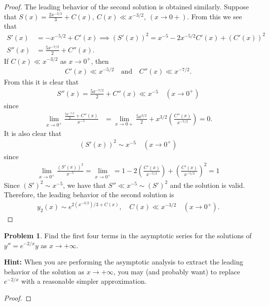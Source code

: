 \documentclass[12pt]{article}
\theoremstyle{definition}
\newtheorem{problem}{Problem}
\begin{document}
\begin{proof}
  The leading behavior of the second solution is obtained similarly.
  Suppose that $S(x) = \frac{2x^{-3/2}}{3} + C(x),\ C(x) \ll x^{-3/2}, \ (x\to 0+)$. From this we see that
  \begin{align*}
    S'(x) &= -x^{-5/2} + C'(x) \implies (S'(x))^2 = x^{-5} -2x^{-5/2}C'(x) + (C'(x))^2 \\
    S''(x) &= \frac{5x^{-7/2}}{2} + C''(x).
  \end{align*}
  If $C(x) \ll x^{-3/2}$ as $x\to 0^+$, then
  \begin{align*}
    C'(x) \ll x^{-5/2} \quad \text{and} \quad C''(x) \ll x^{-7/2}.
  \end{align*}
  From this it is clear that
  \begin{align*}
    S''(x) = \frac{5x^{-7/2}}{2}+ C''(x) \ll x^{-5} \quad (x\to 0^+)
  \end{align*}
  since
  \begin{align*}
    \lim_{x\to 0^+} \frac{\frac{5x^{-7/2}}{2}+ C''(x)}{x^{-5}} &=  \lim_{x\to 0+}\frac{5x^{3/2}}{2} + x^{3/2}\left(\frac{C''(x)}{x^{-7/2}}\right) = 0.
  \end{align*}
  It is also clear that
  \begin{align*}
    (S'(x))^2 \sim x^{-5}\quad (x\to 0^+)
  \end{align*}
  since
  \begin{align*}
    \lim_{x\to 0^+} \frac{(S'(x))^2}{x^{-5}} = \lim_{x\to 0^+} = 1 - 2\left(\frac{C'(x)}{x^{-5/2}}\right) + \left(\frac{C'(x)}{x^{-5/2}}\right)^2 = 1
  \end{align*}
  Since $(S')^2 \sim x^{-5}$, we have that $S'' \ll x^{-5} \sim (S')^2$ and the solution is valid. Therefore, the leading behavior of the second solution is
  \begin{align*}
    y_2(x) \sim e^{2(x^{-3/2})/3 + C(x)},\quad C(x) \ll x^{-3/2} \quad(x\to 0^+).
  \end{align*}

\end{proof}
\newpage


\begin{problem}
  Find the first four terms in the asymptotic series for the solutions of $y'' = e^{-2/x}y$ as $x\to + \infty$.

  \textbf{Hint:} When you are performing the asymptotic analysis to extract the leading
  behavior of the solution as $x\to  + \infty$, you may (and probably want) to replace
  $e^{-2/x}$ with a reasonable simpler approximation.
\end{problem}

\begin{proof}
\end{proof}
\newpage
\end{document}
